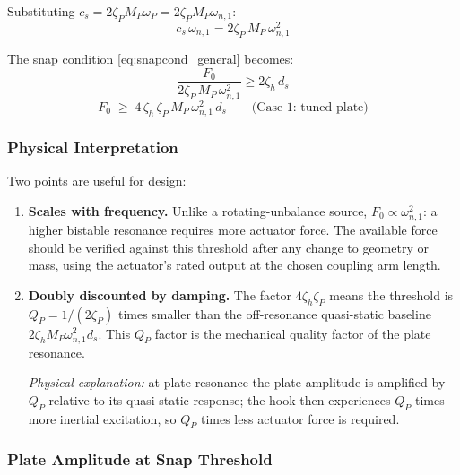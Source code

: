 \documentclass[11pt,letterpaper]{article}
\begin{document}
Substituting $c_s = 2\zeta_P M_P \omega_P = 2\zeta_P M_P \omega_{n,1}$:
\begin{equation}
  c_s\,\omega_{n,1} = 2\zeta_P\,M_P\,\omega_{n,1}^2
  \label{eq:cs_tuned}
\end{equation}

The snap condition \cref{eq:snapcond_general} becomes:
\begin{equation}
  \frac{F_0}{2\zeta_P\,M_P\,\omega_{n,1}^2} \geq 2\zeta_h\,d_s
\end{equation}
\begin{equation}
  \boxed{
    F_0 \;\geq\; 4\,\zeta_h\,\zeta_P\,M_P\,\omega_{n,1}^2\,d_s
    \qquad\text{(Case 1: tuned plate)}
  }
  \label{eq:F0_tuned}
\end{equation}

\subsubsection{Physical Interpretation}

Two points are useful for design:

\begin{enumerate}
  \item \textbf{Scales with frequency.}  Unlike a rotating-unbalance source,
    $F_0 \propto \omega_{n,1}^2$: a higher bistable resonance requires more
    actuator force.  The available force should be verified against this threshold
    after any change to geometry or mass, using the actuator's rated output at the
    chosen coupling arm length.

  \item \textbf{Doubly discounted by damping.} The factor
    $4\zeta_h\zeta_P$ means the threshold is $Q_P = 1/(2\zeta_P)$ times smaller
    than the off-resonance quasi-static baseline $2\zeta_h M_P \omega_{n,1}^2 d_s$.
    This $Q_P$ factor is the mechanical quality factor of the plate resonance.

    \textit{Physical explanation:} at plate resonance the plate amplitude is
    amplified by $Q_P$ relative to its quasi-static response; the hook then
    experiences $Q_P$ times more inertial excitation, so $Q_P$ times less
    actuator force is required.
\end{enumerate}

\subsubsection{Plate Amplitude at Snap Threshold}
\end{document}
